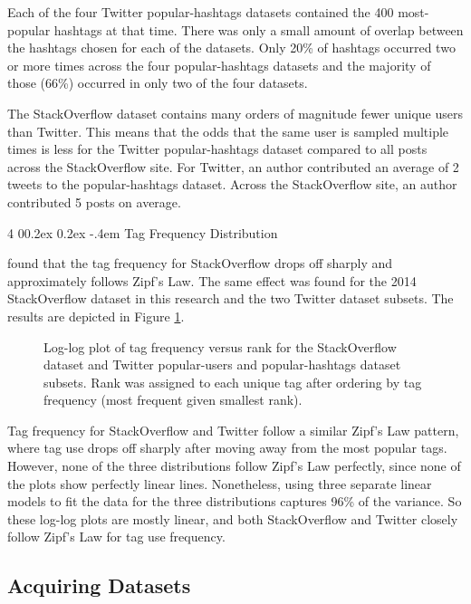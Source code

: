 \documentclass[man,floatsintext,donotrepeattitle]{apa6}
\makeatletter
\renewcommand{\paragraph}{%
  \@startsection
  {paragraph}%
  {4}%
  {\parindent}%
  {0\baselineskip \@plus 0.2ex \@minus 0.2ex}%
  {-.4em}%
  {\normalfont\normalsize\bfseries\itshape\addperi}}
\makeatother
\begin{document}
Each of the four Twitter popular-hashtags datasets contained the 400 most-popular hashtags at that time.
There was only a small amount of overlap between the hashtags chosen for each of the datasets.
Only 20\% of hashtags occurred two or more times across the four popular-hashtags datasets and the majority of those (66\%) occurred in only two of the four datasets.

The StackOverflow dataset contains many orders of magnitude fewer unique users than Twitter.
This means that the odds that the same user is sampled multiple times is less for the Twitter popular-hashtags dataset compared to all posts across the StackOverflow site.
For Twitter, an author contributed an average of 2 tweets to the popular-hashtags dataset.
Across the StackOverflow site, an author contributed 5 posts on average.

\paragraph{Tag Frequency Distribution}

\textcite{Stanley2013} found that the tag frequency for StackOverflow drops off sharply and approximately follows Zipf's Law.
The same effect was found for the 2014 StackOverflow dataset in this research and the two Twitter dataset subsets.
The results are depicted in Figure \ref{figDescTagFreq}.

\begin{figure}[!htbp]
  \caption{
    Log-log plot of tag frequency versus rank for the StackOverflow dataset and Twitter popular-users and popular-hashtags dataset subsets.
    Rank was assigned to each unique tag after ordering by tag frequency (most frequent given smallest rank).
}
  \label{figDescTagFreq}
\end{figure}

Tag frequency for StackOverflow and Twitter follow a similar Zipf's Law pattern, where tag use drops off sharply after moving away from the most popular tags.
However, none of the three distributions follow Zipf's Law perfectly, since none of the plots show perfectly linear lines.
Nonetheless, using three separate linear models to fit the data for the three distributions captures 96\% of the variance.
So these log-log plots are mostly linear, and both StackOverflow and Twitter closely follow Zipf's Law for tag use frequency.

\subsection{Acquiring Datasets}
\end{document}
